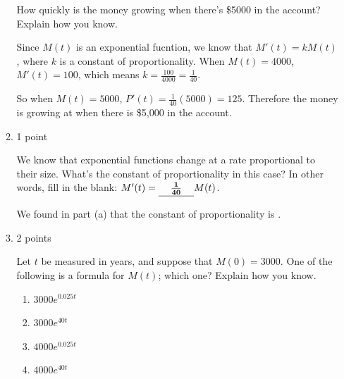 \documentclass{article}
\begin{document}
\begin{enumerate}
\begin{enumerate}
    \begin{problem}[\vfill]
      How quickly is the money growing when there's \$5000 in the account? Explain how you know. 
    \end{problem}

    \begin{solution}
      Since $M(t)$ is an exponential fucntion, we know that 
      $M'(t) = kM(t)$, where $k$ is a constant of proportionality.
      When $M(t)=4000$, $M'(t)=100$, which means $k=\frac{100}{4000}=\frac{1}{40}$.

      So when $M(t)=5000$, $P'(t)=\frac{1}{40}(5000)=125$. Therefore
      the money is growing at  when there is \$5,000 in the account.
    \end{solution}

  \item

    \begin{grading}
      1 point
    \end{grading}

    \begin{problem}[\vfill]
      We know that exponential functions change at a rate proportional to their size. What's the constant of proportionality in this case? In other words, fill in the blank: $M'(t) = \probonly{\vphantom{\dfrac{1}{1}}}\cfitb{0.5in}{\frac{1}{40}} M(t)$.
    \end{problem}

    \begin{solution}
      We found in part (a) that the constant of proportionality is .
    \end{solution}

  \item

    \begin{grading}
      2 points
    \end{grading}

    \begin{problem}[\stretch{1.25}]
      Let $t$ be measured in years, and suppose that $M(0) = 3000$. One of the following is a formula for $M(t)$; which one? Explain how you know. 
      \begin{multicols}{4}
        \begin{enumerate}
        \item $3000 e^{0.025 t}$
        \item $3000 e^{40 t}$
        \item $4000 e^{0.025 t}$
        \item $4000 e^{40 t}$
        \end{enumerate}
      \end{multicols}
    \end{problem}


\end{enumerate}
\end{enumerate}
\end{document}
